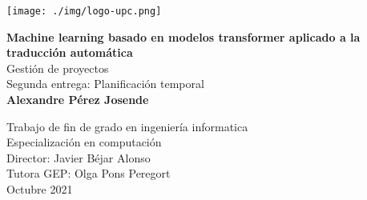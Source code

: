 \begin{titlepage}
\begin{center}

\texttt{[image: ./img/logo-upc.png]}\\[2.0cm]

\vbox{ }

{\LARGE \bfseries  Machine learning basado en modelos transformer aplicado a la traducción automática}\\[1.0cm]
{\Large Gestión de proyectos}\\[0.15cm]
{\large Segunda entrega: Planificación temporal}\\[3.0cm]

{\large \bfseries Alexandre Pérez Josende}
\vfill

{\normalsize Trabajo de fin de grado en ingeniería informatica}\\
{\normalsize Especialización en computación}\\[0.4cm]

{\normalsize Director: Javier Béjar Alonso}\\
{\normalsize Tutora GEP: Olga Pons Peregort}\\[0.4cm]

{\normalsize Octubre 2021}

\end{center}
\end{titlepage}